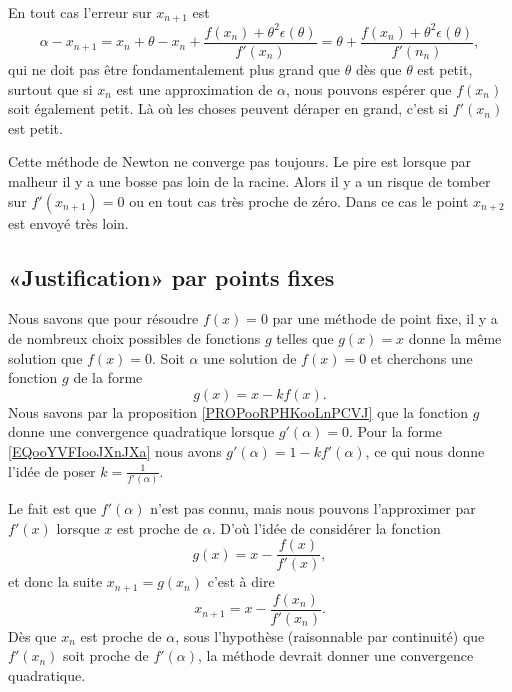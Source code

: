    En tout cas l'erreur sur \( x_{n+1}\) est 
    \begin{equation}
        \alpha-x_{n+1}=x_n+\theta-x_n+\frac{ f(x_n)+\theta^2\epsilon(\theta) }{ f'(x_n) }=\theta+\frac{ f(x_n)+\theta^2\epsilon(\theta) }{ f'(n_n) },
    \end{equation}
    qui ne doit pas être fondamentalement plus grand que \( \theta\) dès que \( \theta\) est petit, surtout que si \( x_n\) est une approximation de \( \alpha\), nous pouvons espérer que \( f(x_n)\) soit également petit. Là où les choses peuvent déraper en grand, c'est si \( f'(x_n)\) est petit.

Cette méthode de Newton ne converge pas toujours. Le pire est lorsque par malheur il y a une bosse pas loin de la racine. Alors il y a un risque de tomber sur \( f'(x_{n+1})=0\) ou en tout cas très proche de zéro. Dans ce cas le point \( x_{n+2}\) est envoyé très loin.

\subsection{«Justification» par points fixes}
\label{SUBSECooIBLNooTujslO}

Nous savons que pour résoudre \( f(x)=0\) par une méthode de point fixe, il y a de nombreux choix possibles de fonctions \( g\) telles que \( g(x)=x\) donne la même solution que \( f(x)=0\). Soit \( \alpha\) une solution de \( f(x)=0\) et cherchons une fonction \( g\) de la forme
\begin{equation}        \label{EQooYVFIooJXnJXa}
    g(x)=x-kf(x).
\end{equation}
Nous savons par la proposition \ref{PROPooRPHKooLnPCVJ} que la fonction \( g\) donne une convergence quadratique lorsque \( g'(\alpha)=0\). Pour la forme \eqref{EQooYVFIooJXnJXa} nous avons \( g'(\alpha)=1-kf'(\alpha)\), ce qui nous donne l'idée de poser \( k=\frac{1}{ f'(\alpha) }\).

Le fait est que \( f'(\alpha)\) n'est pas connu, mais nous pouvons l'approximer par \( f'(x)\) lorsque \( x\) est proche de \( \alpha\). D'où l'idée de considérer la fonction
\begin{equation}
    g(x)=x-\frac{ f(x) }{ f'(x) },
\end{equation}
et donc la suite \( x_{n+1}=g(x_n)\) c'est à dire
\begin{equation}
    x_{n+1}=x-\frac{ f(x_n) }{ f'(x_n) }.
\end{equation}
Dès que \( x_n\) est proche de \( \alpha\), sous l'hypothèse (raisonnable par continuité) que \( f'(x_n)\) soit proche de \( f'(\alpha)\), la méthode devrait donner une convergence quadratique.

